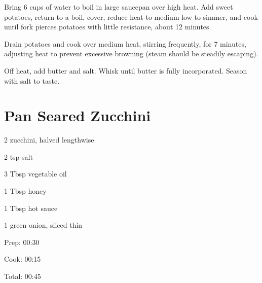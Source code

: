 \documentclass[oneside]{book}  %
\def\thisrecipe{}  %
\newcommand{\recipe}[1]{\section{#1}\def\thisrecipe{: #1}} %
\begin{document}
\begin{directions}
  \item Bring 6 cups of water to boil in large saucepan over high heat. Add
  sweet potatoes, return to a boil, cover, reduce heat to medium-low to simmer,
  and cook until fork pierces potatoes with little resistance, about 12 minutes.

  \item Drain potatoes and cook over medium heat, stirring frequently, for 7
  minutes, adjusting heat to prevent excessive browning (steam should be
  steadily escaping).

  \item Off heat, add butter and salt. Whisk until butter is fully incorporated.
  Season with salt to taste.
\end{directions}
\recipe{Pan Seared Zucchini} \label{recipe:pan_seared_zucchini} %

\begin{IT}
  \begin{ingredients}
    \item[2] zucchini, halved lengthwise
    \item[2 tsp] salt
    \item[3 Tbsp] vegetable oil
    \item[1 Tbsp] honey
    \item[1 Tbsp] hot sauce
    \item[1] green onion, sliced thin
  \end{ingredients}

  \switchcolumn

  \begin{timeline}
    \item[Prep:]  00:30
    \item[Cook:]  00:15
    \item[Total:] 00:45
  \end{timeline}
\end{IT}
\end{document}

